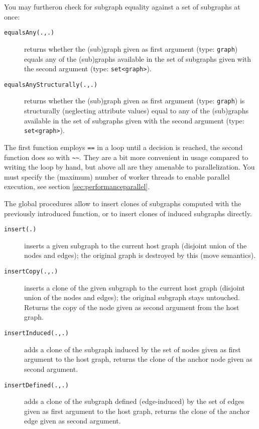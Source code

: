 You may furtheron check for subgraph equality against a set of subgraphs at once:

\begin{description}
\item[\texttt{equalsAny(.,.)}] returns whether the (sub)graph given as first argument (type: \texttt{graph}) equals any of the (sub)graphs available in the set of subgraphs given with the second argument (type: \texttt{set<graph>}).
\item[\texttt{equalsAnyStructurally(.,.)}] returns whether the (sub)graph given as first argument (type: \texttt{graph}) is structurally (neglecting attribute values) equal to any of the (sub)graphs available in the set of subgraphs given with the second argument (type: \texttt{set<graph>}).
\end{description}

The first function employs \verb#==# in a loop until a decision is reached, the second function does so with \verb#~~#.
They are a bit more convenient in usage compared to writing the loop by hand, but above all are they amenable to parallelization.
You must specify the (maximum) number of worker threads to enable parallel execution, see section \ref{sec:performanceparallel}.
 
The global procedures allow to insert clones of subgraphs computed with the previously introduced function,
or to insert clones of induced subgraphs directly.

\begin{description}
\item[\texttt{insert(.)}] inserts a given subgraph to the current host graph (disjoint union of the nodes and edges); the original graph is destroyed by this (move semantics).
\item[\texttt{insertCopy(.,.)}] inserts a clone of the given subgraph to the current host graph (disjoint union of the nodes and edges); the original subgraph stays untouched. Returns the copy of the node given as second argument from the host graph.
\item[\texttt{insertInduced(.,.)}] adds a clone of the subgraph induced by the set of nodes given as first argument to the host graph, returns the clone of the anchor node given as second argument.
\item[\texttt{insertDefined(.,.)}] adds a clone of the subgraph defined (edge-induced) by the set of edges given as first argument to the host graph, returns the clone of the anchor edge given as second argument.
\end{description}

